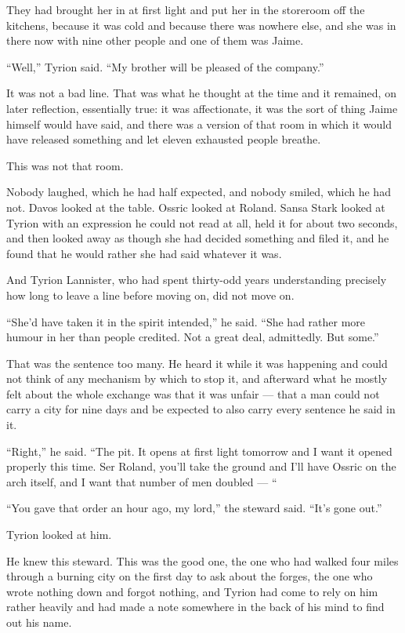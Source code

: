 They had brought her in at first light and put her in the storeroom off the kitchens, because it was cold and because there was nowhere else, and she was in there now with nine other people and one of them was Jaime.

“Well,” Tyrion said. “My brother will be pleased of the company.”

It was not a bad line. That was what he thought at the time and it remained, on later reflection, essentially true: it was affectionate, it was the sort of thing Jaime himself would have said, and there was a version of that room in which it would have released something and let eleven exhausted people breathe.

This was not that room.

Nobody laughed, which he had half expected, and nobody smiled, which he had not. Davos looked at the table. Ossric looked at Roland. Sansa Stark looked at Tyrion with an expression he could not read at all, held it for about two seconds, and then looked away as though she had decided something and filed it, and he found that he would rather she had said whatever it was.

And Tyrion Lannister, who had spent thirty-odd years understanding precisely how long to leave a line before moving on, did not move on.

“She’d have taken it in the spirit intended,” he said. “She had rather more humour in her than people credited. Not a great deal, admittedly. But some.”

That was the sentence too many. He heard it while it was happening and could not think of any mechanism by which to stop it, and afterward what he mostly felt about the whole exchange was that it was unfair — that a man could not carry a city for nine days and be expected to also carry every sentence he said in it.

\sceneBreak

“Right,” he said. “The pit. It opens at first light tomorrow and I want it opened properly this time. Ser Roland, you’ll take the ground and I’ll have Ossric on the arch itself, and I want that number of men doubled — “

“You gave that order an hour ago, my lord,” the steward said. “It’s gone out.”

Tyrion looked at him.

He knew this steward. This was the good one, the one who had walked four miles through a burning city on the first day to ask about the forges, the one who wrote nothing down and forgot nothing, and Tyrion had come to rely on him rather heavily and had made a note somewhere in the back of his mind to find out his name.

